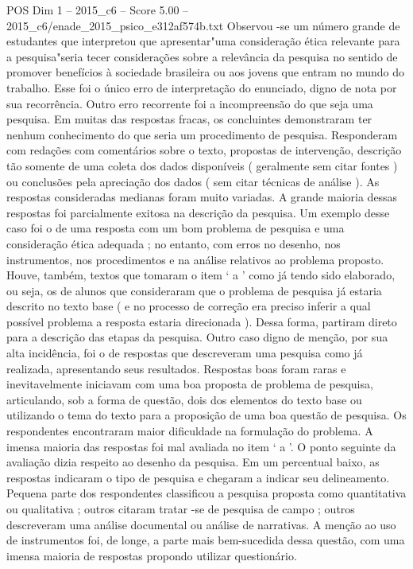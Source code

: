 \begin{textsample}{POS Dim 1 – 2015\_c6 – Score 5.00 – 2015\_c6/enade\_2015\_psico\_e312af574b.txt}
Observou -se um número grande de estudantes que interpretou que apresentar"uma consideração ética relevante para a pesquisa"seria tecer considerações sobre a relevância da pesquisa no sentido de promover benefícios à sociedade brasileira ou aos jovens que entram no mundo do trabalho.
Esse foi o único erro de interpretação do enunciado, digno de nota por sua recorrência.
Outro erro recorrente foi a incompreensão do que seja uma pesquisa.
Em muitas das respostas fracas, os concluintes demonstraram ter nenhum conhecimento do que seria um procedimento de pesquisa.
Responderam com redações com comentários sobre o texto, propostas de intervenção, descrição tão somente de uma coleta dos dados disponíveis ( geralmente sem citar fontes ) ou conclusões pela apreciação dos dados ( sem citar técnicas de análise ).
As respostas consideradas medianas foram muito variadas.
A grande maioria dessas respostas foi parcialmente exitosa na descrição da pesquisa.
Um exemplo desse caso foi o de uma resposta com um bom problema de pesquisa e uma consideração ética adequada ; no entanto, com erros no desenho, nos instrumentos, nos procedimentos e na análise relativos ao problema proposto.
Houve, também, textos que tomaram o item ‘ a ’ como já tendo sido elaborado, ou seja, os de alunos que consideraram que o problema de pesquisa já estaria descrito no texto base ( e no processo de correção era preciso inferir a qual possível problema a resposta estaria direcionada ).
Dessa forma, partiram direto para a descrição das etapas da pesquisa.
Outro caso digno de menção, por sua alta incidência, foi o de respostas que descreveram uma pesquisa como já realizada, apresentando seus resultados.
Respostas boas foram raras e inevitavelmente iniciavam com uma boa proposta de problema de pesquisa, articulando, sob a forma de questão, dois dos elementos do texto base ou utilizando o tema do texto para a proposição de uma boa questão de pesquisa.
Os respondentes encontraram maior dificuldade na formulação do problema.
A imensa maioria das respostas foi mal avaliada no item ‘ a ’.
O ponto seguinte da avaliação dizia respeito ao desenho da pesquisa.
Em um percentual baixo, as respostas indicaram o tipo de pesquisa e chegaram a indicar seu delineamento.
Pequena parte dos respondentes classificou a pesquisa proposta como quantitativa ou qualitativa ; outros citaram tratar -se de pesquisa de campo ; outros descreveram uma análise documental ou análise de narrativas.
A menção ao uso de instrumentos foi, de longe, a parte mais bem-sucedida dessa questão, com uma imensa maioria de respostas propondo utilizar questionário.

\end{textsample}
